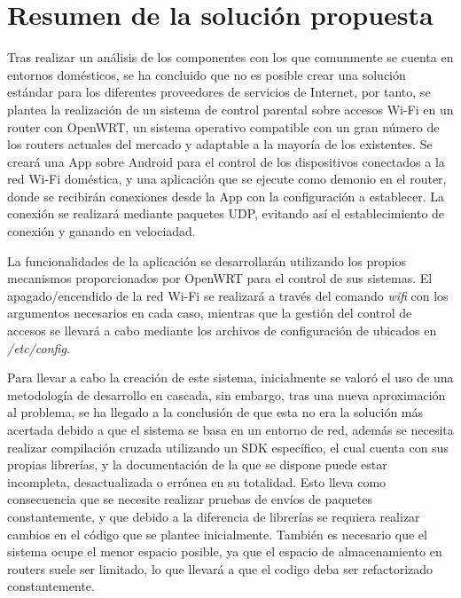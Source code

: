 \documentclass[12pt]{article}
\begin{document}
\section{Resumen de la solución propuesta}
    Tras realizar un análisis de los componentes con los que comunmente se cuenta en entornos domésticos, se ha concluido que no es posible crear una solución estándar para los diferentes proveedores de servicios de Internet, por tanto, se plantea la realización de un sistema de control parental sobre accesos Wi-Fi en un router con OpenWRT, un sistema operativo compatible con un gran número de los routers actuales del mercado y adaptable a la mayoría de los existentes. Se creará una App sobre Android para el control de los dispositivos conectados a la red Wi-Fi doméstica, y una aplicación que se ejecute como demonio en el router, donde se recibirán conexiones desde la App con la configuración a establecer. La conexión se realizará mediante paquetes UDP, evitando así el establecimiento de conexión y ganando en velociadad.

    La funcionalidades de la aplicación se desarrollarán utilizando los propios mecanismos proporcionados por OpenWRT para el control de sus sistemas. El apagado/encendido de la red Wi-Fi se realizará a través del comando \textit{wifi} con los argumentos necesarios en cada caso, mientras que la gestión del control de accesos se llevará a cabo mediante los archivos de configuración de ubicados en \textit{/etc/config}.

    Para llevar a cabo la creación de este sistema, inicialmente se valoró el uso de una metodología de desarrollo en cascada, sin embargo, tras una nueva aproximación al problema, se ha llegado a la conclusión de que esta no era la solución más acertada debido a que el sistema se basa en un entorno de red, además se necesita realizar compilación cruzada utilizando un SDK específico, el cual cuenta con sus propias librerías, y la documentación de la que se dispone puede estar incompleta, desactualizada o errónea en su totalidad. Esto lleva como consecuencia que se necesite realizar pruebas de envíos de paquetes constantemente, y que debido a la diferencia de librerías se requiera realizar cambios en el código que se plantee inicialmente. También es necesario que el sistema ocupe el menor espacio posible, ya que el espacio de almacenamiento en routers suele ser limitado, lo que llevará a que el codigo deba ser refactorizado constantemente.
    
\end{document}

